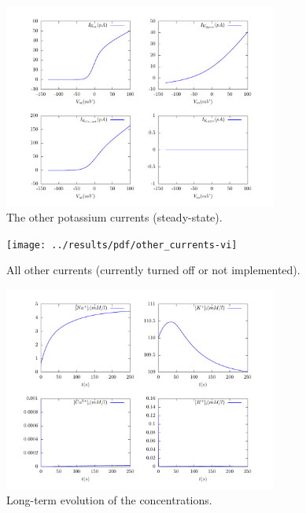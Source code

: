\begin{figure}
  \centering
  \includegraphics[width=0.8\textwidth]
  {../results/pdf/20110506/potassium_currents-vi}
  \caption{The other potassium currents (steady-state).}
  \label{fig:potassium-currents-vi}
\end{figure}

\begin{figure}
  \centering
  \texttt{[image: ../results/pdf/other\_currents-vi]}
  \caption{All other currents (currently turned off or not implemented).}
  \label{fig:other-behaviour-vi}
\end{figure}

\begin{figure}
  \centering
  \includegraphics[width=0.8\textwidth]
  {../results/pdf/20110506/concentrations}
  \caption{Long-term evolution of the concentrations.}
  \label{fig:concentrations}
\end{figure}


